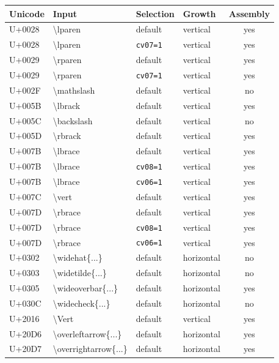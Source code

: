 \documentclass[10pt]{article}
\newcommand\feat[1]{\texttt{#1}}
\begin{document}
\begingroup\small\setlength\tabcolsep{4pt}
\begin{longtable}{>{\ttfamily}l>{\ttfamily}lllc}
\toprule
\normalfont Unicode & \normalfont Input & Selection & Growth & Assembly \\
\midrule
\endhead
U+0028 & \textbackslash{}lparen & default & vertical & yes \\
U+0028 & \textbackslash{}lparen & \feat{cv07=1} & vertical & yes \\
U+0029 & \textbackslash{}rparen & default & vertical & yes \\
U+0029 & \textbackslash{}rparen & \feat{cv07=1} & vertical & yes \\
U+002F & \textbackslash{}mathslash & default & vertical & no \\
U+005B & \textbackslash{}lbrack & default & vertical & yes \\
U+005C & \textbackslash{}backslash & default & vertical & no \\
U+005D & \textbackslash{}rbrack & default & vertical & yes \\
U+007B & \textbackslash{}lbrace & default & vertical & yes \\
U+007B & \textbackslash{}lbrace & \feat{cv08=1} & vertical & yes \\
U+007B & \textbackslash{}lbrace & \feat{cv06=1} & vertical & yes \\
U+007C & \textbackslash{}vert & default & vertical & yes \\
U+007D & \textbackslash{}rbrace & default & vertical & yes \\
U+007D & \textbackslash{}rbrace & \feat{cv08=1} & vertical & yes \\
U+007D & \textbackslash{}rbrace & \feat{cv06=1} & vertical & yes \\
U+0302 & \textbackslash{}widehat\{...\} & default & horizontal & no \\
U+0303 & \textbackslash{}widetilde\{...\} & default & horizontal & no \\
U+0305 & \textbackslash{}wideoverbar\{...\} & default & horizontal & yes \\
U+030C & \textbackslash{}widecheck\{...\} & default & horizontal & no \\
U+2016 & \textbackslash{}Vert & default & vertical & yes \\
U+20D6 & \textbackslash{}overleftarrow\{...\} & default & horizontal & yes \\
U+20D7 & \textbackslash{}overrightarrow\{...\} & default & horizontal & yes \\

\end{longtable}
\end{document}
